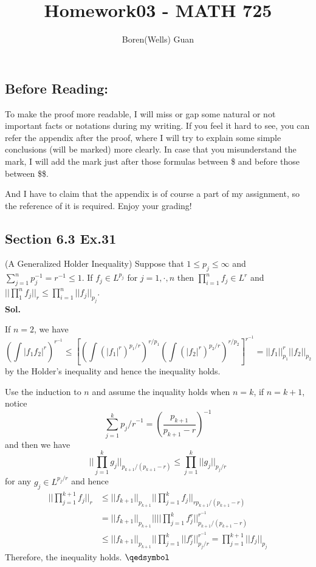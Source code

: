 \documentclass[lang=en,11pt,a4paper,citestyle =authoryear]{elegantpaper}
\title{Homework03 - MATH 725}
\author{Boren(Wells) Guan}
\newcommand{\prvd}{$\hfill \qedsymbol$}
\begin{document}
\maketitle

\subsection*{Before Reading:}\par
To make the proof more readable, I will miss or gap some natural or not important facts or notations during my writing. If you feel it hard to see, you can refer the appendix after the proof, where I will try to explain some simple conclusions (will be marked) more clearly. In case that you misunderstand the mark, I will add the mark just after those formulas between \$ and before those between \$\$.\par
And I have to claim that the appendix is of course a part of my assignment, so the reference of it is required. Enjoy your grading!

\subsection*{Section 6.3 Ex.31} 
(A Generalized Holder Inequality) Suppose that $1\leq p_j \leq \infty$ and $\sum\limits_{j=1}^n p_j^{-1} = r^{-1} \leq 1$. If $f_j \in L^{p_j}$ for $j = 1,\cdot,n$ then $\prod_{i=1}^n f_j \in L^r$ and $||\prod_1^n f_j||_r \leq \prod_{i=1}^n ||f_j||_{p_j}$.
\vspace{0.5em}\\
\textbf{Sol.} \par
If $n=2$, we have
\[
(\int |f_1f_2|^r)^{r^{-1}} \leq [(\int (|f_1|^r)^{p_1/r})^{r/p_1}(\int (|f_2|^r)^{p_2/r})^{r/p_2}]^{r^{-1}} = ||f_1||_{p_1}^r||f_2||_{p_2}
\]
by the Holder's inequality and hence the inequality holds.\par
Use the induction to $n$ and assume the inquality holds when $n=k$, if $n=k+1$, notice
\[
\sum\limits_{j=1}^k {p_j/r}^{-1} = (\dfrac{p_{k+1}}{p_{k+1}-r})^{-1}
\]
and then we have
\[
||\prod_{j=1}^k g_j||_{p_{k+1}/(p_{k+1}-r)} \leq \prod_{j=1}^k ||g_j||_{p_j/r}
\]
for any $g_j \in L^{p_j/r}$ and hence
\[
\begin{aligned}
||\prod_{j=1}^{k+1} f_j||_{r} &\leq ||f_{k+1}||_{p_{k+1}}||\prod_{j=1}^{k} f_j||_{rp_{k+1}/(p_{k+1}-r)} \\ &= ||f_{k+1}||_{p_{k+1}}||||\prod_{j=1}^{k} f_j^r||_{p_{k+1}/(p_{k+1}-r)}^{r^{-1}} \\ &\leq ||f_{k+1}||_{p_{k+1}}||\prod_{j=1}^k ||f_j^r||_{p_j/r}^{r^{-1}} = \prod_{j=1}^{k+1} ||f_j||_{p_j}
\end{aligned}
\]
Therefore, the inequality holds.
\prvd
\vspace{0.5em}
\end{document}
